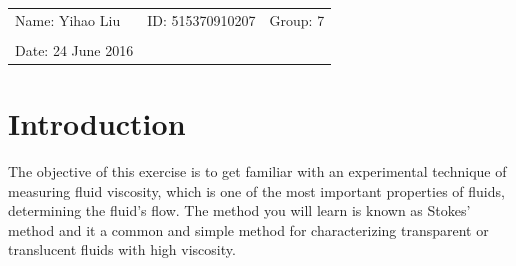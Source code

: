 \documentclass{article}
\begin{document}
\vspace*{0.25cm}

\hrulefill

\thispagestyle{empty}

\begin{center}
\begin{large}
\end{large}

\hrulefill

\vspace*{5cm}
\begin{Large}
\end{Large}

\vspace{2em}

\begin{large}
\end{large}
\end{center}


\vfill

\begin{table}[h!]
\flushleft
\begin{tabular}{lll}
Name: Yihao Liu \hspace*{2em}&
ID: 515370910207\hspace*{2em}
& Group: 7\\


\\

Date: 24 June 2016 

\end{tabular}
\end{table}

\hfill
\begin{tiny}
[rev. 1.0]
\end{tiny}
\newpage

\section{Introduction}

The objective of this exercise is to get familiar with an experimental technique of measuring fluid viscosity, which is one of the most important properties of fluids, determining the fluid's flow. The method you will learn is known as Stokes' method and it a common and simple method for characterizing transparent or translucent fluids with high viscosity.
\\
\end{document}
